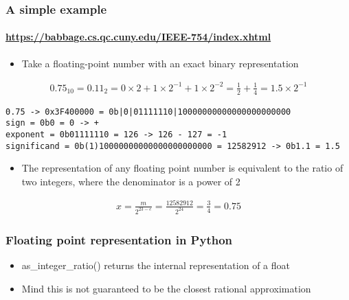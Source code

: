 \documentclass[9pt]{beamer}
\begin{document}
\begin{frame}[fragile]
  \frametitle{A simple example}
  \framesubtitle{\url{https://babbage.cs.qc.cuny.edu/IEEE-754/index.xhtml}}
  \begin{itemize}
  \item Take a floating-point number with an exact binary representation
  \end{itemize}
  \begin{align}
    0.75_{10} = 0.11_{2} = 0 \times 2 + 1 \times 2^{-1} + 1 \times 2^{-2} =
    \frac{1}{2} + \frac{1}{4} = 1.5 \times 2^{-1}
  \end{align}

  \begin{Verbatim}
0.75 -> 0x3F400000 = 0b|0|01111110|10000000000000000000000
sign = 0b0 = 0 -> +
exponent = 0b01111110 = 126 -> 126 - 127 = -1
significand = 0b(1)10000000000000000000000 = 12582912 -> 0b1.1 = 1.5
  \end{Verbatim}
  \begin{itemize}
  \item The representation of any floating point number is equivalent to the
    ratio of two integers, where the denominator is a power of 2
  \end{itemize}

  \begin{align}
    x = \frac{m}{2^{23 - e}} = \frac{12582912}{2^{24}} = \frac{3}{4} = 0.75
  \end{align}
\end{frame}


\begin{frame}[fragile]
  \frametitle{Floating point representation in Python}
  

  \begin{itemize}
  \item as\_integer\_ratio() returns the internal representation of a float
  \item Mind this is not guaranteed to be the closest rational approximation
  \end{itemize}
\end{frame}
\end{document}
